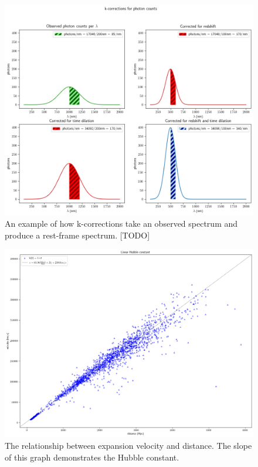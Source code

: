 \documentclass{article}
\begin{document}
\begin{figure}[ht]
  \includegraphics[width=\linewidth]{k-corrections_for_photon_counts.png}
  \caption{An example of how k-corrections take an observed spectrum and
  produce a rest-frame spectrum. [TODO]
  }
\end{figure}

\begin{figure}[ht]
  \includegraphics[width=\linewidth]{velocity_vs_distance.png}
  \caption{The relationship between expansion velocity and distance. The slope of this graph demonstrates the Hubble constant.
  }
\end{figure}
\end{document}

